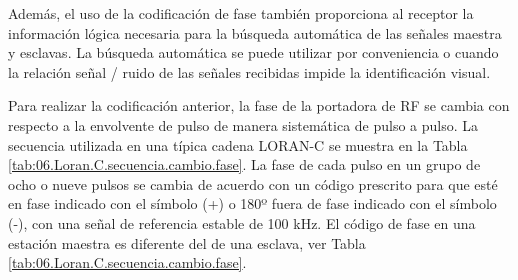 Además, el uso de la codificación de fase también proporciona al receptor la información lógica necesaria para la búsqueda automática de las señales maestra y esclavas. La búsqueda automática se puede utilizar por conveniencia o cuando la relación señal / ruido de las señales recibidas impide la identificación visual.

 



Para realizar la codificaci\'on anterior,  la fase de la portadora de RF se cambia con respecto a la envolvente de pulso de manera sistemática de pulso a pulso. 
La secuencia utilizada en una típica cadena LORAN-C se muestra en la Tabla \ref{tab:06.Loran.C.secuencia.cambio.fase}.
La fase de cada pulso en un grupo de ocho o nueve pulsos se cambia de acuerdo con un código prescrito para que esté en fase indicado con el s\'imbolo (+) o 180º fuera de fase indicado con el s\'imbolo (-), con una señal de referencia estable de 100 kHz. 
El código de fase en una estación maestra es diferente del de una esclava, ver 
Tabla \ref{tab:06.Loran.C.secuencia.cambio.fase}.


